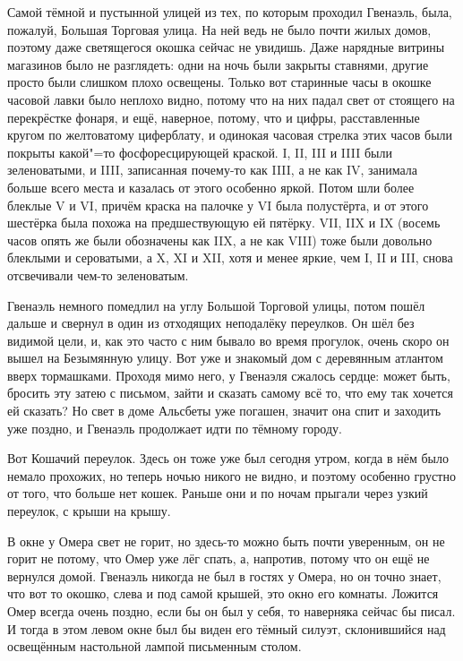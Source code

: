 Самой тёмной и пустынной улицей из тех, по которым проходил Гвенаэль, была,
пожалуй, Большая Торговая улица.
На ней ведь не было почти жилых домов, поэтому даже светящегося окошка сейчас не
увидишь.
Даже нарядные витрины магазинов было не разглядеть: одни на ночь были закрыты
ставнями, другие просто были слишком плохо освещены.
Только вот старинные часы в окошке часовой лавки было неплохо видно, потому что
на них падал свет от стоящего на перекрёстке фонаря, и ещё, наверное, потому, что
и цифры, расставленные кругом по желтоватому циферблату, и одинокая часовая
стрелка этих часов были покрыты какой"=то фосфоресцирующей краской.
I, II, III и IIII были зеленоватыми, и IIII, записанная почему-то как IIII, а не
как IV, занимала больше всего места и казалась от этого особенно яркой.
Потом шли более блеклые V и VI, причём краска на палочке у VI была полустёрта,
и от этого шестёрка была похожа на предшествующую ей пятёрку.
VII, IIX и IX (восемь часов опять же были обозначены как IIX, а не как VIII)
тоже были довольно блеклыми и сероватыми, а X, XI и XII, хотя и менее яркие, чем
I, II и III, снова отсвечивали чем-то зеленоватым.

Гвенаэль немного помедлил на углу Большой Торговой улицы, потом пошёл дальше и
свернул в один из отходящих неподалёку переулков.
Он шёл без видимой цели, и, как это часто с ним бывало во время прогулок, очень
скоро он вышел на Безымянную улицу.
Вот уже и знакомый дом с деревянным атлантом вверх тормашками.
Проходя мимо него, у Гвенаэля сжалось сердце: может быть, бросить эту затею с
письмом, зайти и сказать самому всё то, что ему так хочется ей сказать?
Но свет в доме Альсбеты уже погашен, значит она спит и заходить уже поздно, и
Гвенаэль продолжает идти по тёмному городу.

Вот Кошачий переулок.
Здесь он тоже уже был сегодня утром, когда в нём было немало прохожих, но теперь
ночью никого не видно, и поэтому особенно грустно от того, что больше нет кошек.
Раньше они и по ночам прыгали через узкий переулок, с крыши на крышу.

В окне у Омера свет не горит, но здесь-то можно быть почти уверенным, он не
горит не потому, что Омер уже лёг спать, а, напротив, потому что он ещё не
вернулся домой.
Гвенаэль никогда не был в гостях у Омера, но он точно знает, что вот то окошко,
слева и под самой крышей, это окно его комнаты.
Ложится Омер всегда очень поздно, если бы он был у себя, то наверняка сейчас бы
писал.
И тогда в этом левом окне был бы виден его тёмный силуэт, склонившийся над
освещённым настольной лампой письменным столом.

